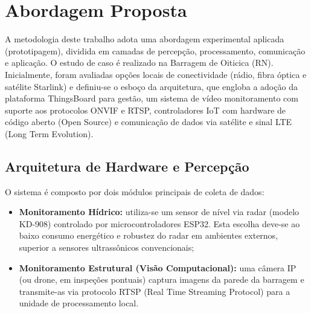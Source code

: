 \chapter{Abordagem Proposta}
\label{cap:cap3}

A metodologia deste trabalho adota uma abordagem experimental aplicada (prototipagem), dividida em camadas de percepção, processamento, comunicação e aplicação. O estudo de caso é realizado na Barragem de Oiticica (RN). Inicialmente, foram avaliadas opções locais de conectividade (rádio, fibra óptica e satélite Starlink) e definiu-se o esboço da arquitetura, que engloba a adoção da plataforma ThingsBoard para gestão, um sistema de vídeo monitoramento com suporte aos protocolos ONVIF e RTSP, controladores IoT com hardware de código aberto (Open Source) e comunicação de dados via satélite e sinal LTE (Long Term Evolution).

\section{Arquitetura de Hardware e Percepção}
O sistema é composto por dois módulos principais de coleta de dados:
\begin{itemize}
    \item \textbf{Monitoramento Hídrico:} utiliza-se um sensor de nível via radar (modelo KD-908) controlado por microcontroladores ESP32. Esta escolha deve-se ao baixo consumo energético e robustez do radar em ambientes externos, superior a sensores ultrassônicos convencionais;
    \item \textbf{Monitoramento Estrutural (Visão Computacional):} uma câmera IP (ou drone, em inspeções pontuais) captura imagens da parede da barragem e transmite-as via protocolo RTSP (Real Time Streaming Protocol) para a unidade de processamento local.
\end{itemize}

